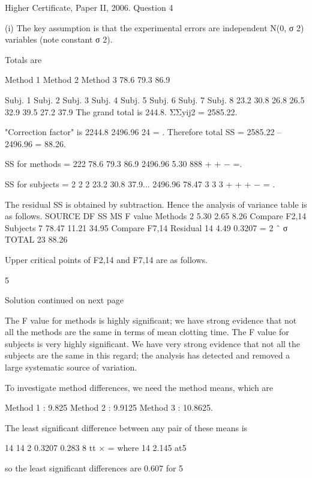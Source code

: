 \documentclass[a4paper,12pt]{article}
\begin{document}
Higher Certificate, Paper II, 2006.  Question 4 
 
 
(i) The key assumption is that the experimental errors are independent N(0, σ 2) variables (note constant σ 2). 
 
Totals are 
 
Method 1 Method 2 Method 3 78.6 79.3 86.9 
 
Subj. 1 Subj. 2 Subj. 3 Subj. 4 Subj. 5 Subj. 6 Subj. 7 Subj. 8 23.2 30.8 26.8 26.5 32.9 39.5 27.2 37.9 
 The grand total is 244.8.     ΣΣyij2 = 2585.22. 
 
"Correction factor" is 
2244.8 2496.96 24 = . 
 Therefore total SS = 2585.22 – 2496.96 = 88.26. 
 
SS for methods = 
222 78.6 79.3 86.9 2496.96 5.30 888 + + − =. 
 
SS for subjects = 
2 2 2 23.2 30.8 37.9... 2496.96 78.47 3 3 3 + + + − = . 
 
 
The residual SS is obtained by subtraction. 
 Hence the analysis of variance table is as follows. 
 SOURCE DF SS MS F value Methods   2   5.30   2.65        8.26   Compare F2,14 Subjects   7 78.47 11.21      34.95   Compare F7,14 Residual 14   4.49 0.3207 = 2 ˆ σ
 TOTAL 23 88.26   
 
 
Upper critical points of F2,14 and F7,14 are as follows. 
 
 5%
 
 
 
 
 
Solution continued on next page 
 
The F value for methods is highly significant;  we have strong evidence that not all the methods are the same in terms of mean clotting time.  The F value for subjects is very highly significant.  We have very strong evidence that not all the subjects are the same in this regard;  the analysis has detected and removed a large systematic source of variation. 
 
 
 
To investigate method differences, we need the method means, which are 
 
Method 1 :   9.825         Method 2 :   9.9125         Method 3 :   10.8625. 
 
The least significant difference between any pair of these means is 
 
14 14 2 0.3207 0.283 8 tt × =     where   14 2.145 at5%
 
so the least significant differences are 0.607 for 5%
 
\end{document}
